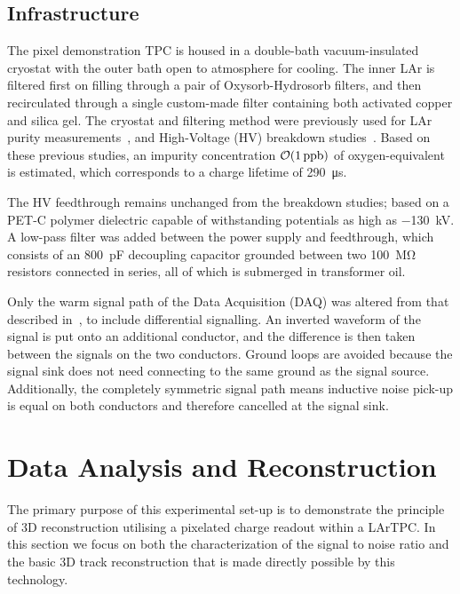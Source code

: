 \documentclass[instruments,article,submit,moreauthors,pdftex]{Definitions/mdpi}
\begin{document}
\subsection{Infrastructure}

The pixel demonstration TPC is housed in a double-bath vacuum-insulated cryostat with the outer bath open to atmosphere for cooling.
The inner LAr is filtered first on filling through a pair of Oxysorb-Hydrosorb filters, and then recirculated through a single custom-made filter containing both activated copper and silica gel.
The cryostat and filtering method were previously used for LAr purity measurements~\cite{purititty}, and High-Voltage (HV) breakdown studies~\cite{HVoriginal}.
Based on these previous studies, an impurity concentration $\order{\SI{1}{ppb}}$ of oxygen-equivalent is estimated, which corresponds to a charge lifetime of \SI{290}{\micro\second}.

The HV feedthrough remains unchanged from the breakdown studies; based on a PET-C polymer dielectric capable of withstanding potentials as high as \SI{-130}{\kilo\volt}.
A low-pass filter was added between the power supply and feedthrough, which consists of an \SI{800}{\pico\farad} decoupling capacitor grounded between two \SI{100}{\mega\ohm} resistors connected in series, all of which is submerged in transformer oil.  

Only the warm signal path of the Data Acquisition (DAQ) was altered from that described in~\cite{protoLASER}, to include differential signalling.
An inverted waveform of the signal is put onto an additional conductor, and the difference is then taken between the signals on the two conductors.
Ground loops are avoided because the signal sink does not need connecting to the same ground as the signal source.
Additionally, the completely symmetric signal path means inductive noise pick-up is equal on both conductors and therefore cancelled at the signal sink.

\section{Data Analysis and Reconstruction} \label{sec:results}

The primary purpose of this experimental set-up is to demonstrate the principle of 3D reconstruction utilising a pixelated charge readout within a LArTPC. 
In this section we focus on both the characterization of the signal to noise ratio and the basic 3D track reconstruction that is made directly possible by this technology.
\end{document}
